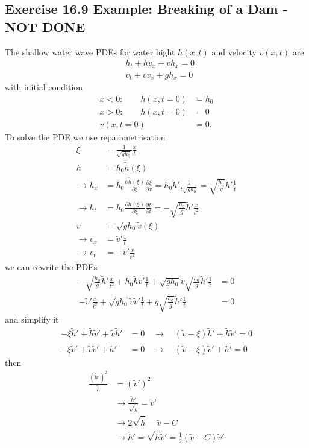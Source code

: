 \documentclass[../main.tex]{subfiles}
\begin{document}
\subsection{Exercise 16.9 Example: Breaking of a Dam - NOT DONE}
The shallow water wave PDEs for water hight $h(x,t)$ and velocity $v(x,t)$ are
\begin{align}
    &h_t+hv_x+vh_x=0\\
    &v_t+vv_x+gh_x=0
\end{align}
with initial condition
\begin{align}
x<0:\qquad h(x,t=0)&=h_0\\
x>0:\qquad h(x,t=0)&=0\\
v(x,t=0)&=0.
\end{align}
To solve the PDE we use reparametrisation
\begin{align}
\xi&=\frac{1}{\sqrt{gh_0}}\frac{x}{t}\\
h&=h_0\tilde{h}(\xi)\\
\rightarrow h_x&=h_0\frac{\partial\tilde{h}(\xi)}{\partial\xi}\frac{\partial\xi}{\partial x}
=h_0\tilde{h}'\frac{1}{t\sqrt{gh_0}}
=\sqrt{\frac{h_0}{g}}\tilde{h}'\frac{1}{t}\\
\rightarrow  h_t&=h_0\frac{\partial\tilde{h}(\xi)}{\partial\xi}\frac{\partial\xi}{\partial t}=-\sqrt{\frac{h_0}{g}}\tilde{h}'\frac{x}{t^2}\\
v&=\sqrt{gh_0}\tilde{v}(\xi)\\
\rightarrow v_x&=\tilde{v}'\frac{1}{t}\\
\rightarrow v_t&=-\tilde{v}'\frac{x}{t^2}
\end{align}
we can rewrite the PDEs
\begin{align}
-\sqrt{\frac{h_0}{g}}\tilde{h}'\frac{x}{t^2}+h_0\tilde{h}\tilde{v}'\frac{1}{t}+\sqrt{gh_0}\tilde{v}\sqrt{\frac{h_0}{g}}\tilde{h}'\frac{1}{t}&=0\\
-\tilde{v}'\frac{x}{t^2}+\sqrt{gh_0}\tilde{v}\tilde{v}'\frac{1}{t}+g\sqrt{\frac{h_0}{g}}\tilde{h}'\frac{1}{t}&=0
\end{align}
and simplify it
\begin{align}
-\xi\tilde{h}'+\tilde{h}\tilde{v}'+\tilde{v}\tilde{h}'&=0\quad\rightarrow\quad (\tilde{v}-\xi)\tilde{h}'+\tilde{h}\tilde{v}'=0\\
-\xi\tilde{v}'+\tilde{v}\tilde{v}'+\tilde{h}'&=0\quad\rightarrow\quad (\tilde{v}-\xi)\tilde{v}'+\tilde{h}'=0
\end{align}
then
\begin{align}
\frac{(\tilde{h}')^2}{\tilde{h}}&=(\tilde{v}')^2\\
&\rightarrow \frac{\tilde{h}'}{\sqrt{\tilde{h}}}=\tilde{v}'\\
&\rightarrow 2\sqrt{\tilde{h}}=\tilde{v}-C\\
&\rightarrow \tilde{h}'=\sqrt{\tilde{h}}\tilde{v}'=\frac{1}{2}(\tilde{v}-C)\tilde{v}'
\end{align}
\end{document}
